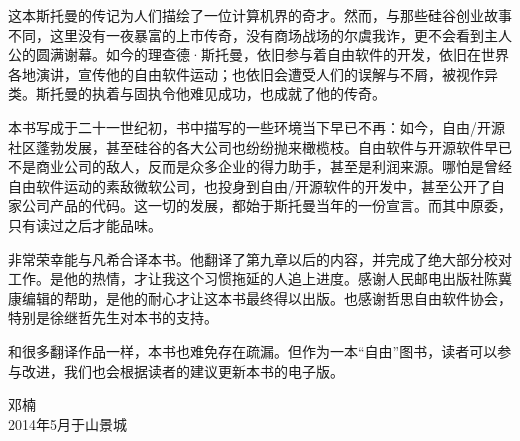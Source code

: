 这本斯托曼的传记为人们描绘了一位计算机界的奇才。然而，与那些硅谷创业故事不同，这里没有一夜暴富的上市传奇，没有商场战场的尔虞我诈，更不会看到主人公的圆满谢幕。如今的理查德·斯托曼，依旧参与着自由软件的开发，依旧在世界各地演讲，宣传他的自由软件运动；也依旧会遭受人们的误解与不屑，被视作异类。斯托曼的执着与固执令他难见成功，也成就了他的传奇。

本书写成于二十一世纪初，书中描写的一些环境当下早已不再：如今，自由/开源社区蓬勃发展，甚至硅谷的各大公司也纷纷抛来橄榄枝。自由软件与开源软件早已不是商业公司的敌人，反而是众多企业的得力助手，甚至是利润来源。哪怕是曾经自由软件运动的素敌微软公司，也投身到自由/开源软件的开发中，甚至公开了自家公司产品的代码。这一切的发展，都始于斯托曼当年的一份宣言。而其中原委，只有读过之后才能品味。

非常荣幸能与凡希合译本书。他翻译了第九章以后的内容，并完成了绝大部分校对工作。是他的热情，才让我这个习惯拖延的人追上进度。感谢人民邮电出版社陈冀康编辑的帮助，是他的耐心才让这本书最终得以出版。也感谢哲思自由软件协会，特别是徐继哲先生对本书的支持。

和很多翻译作品一样，本书也难免存在疏漏。但作为一本``自由''图书，读者可以参与改进，我们也会根据读者的建议更新本书的电子版。

邓楠\\
2014年5月于山景城




